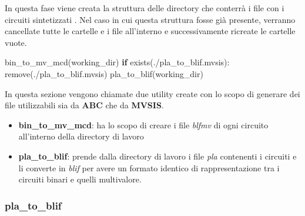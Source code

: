 \documentclass[
]{book}
\newenvironment{Shaded}{\begin{snugshade}}{\end{snugshade}}
\newcommand{\ControlFlowTok}[1]{\textcolor[rgb]{0.13,0.29,0.53}{\textbf{#1}}}
\newcommand{\NormalTok}[1]{#1}
\newcommand{\StringTok}[1]{\textcolor[rgb]{0.31,0.60,0.02}{#1}}
\providecommand{\tightlist}{%
  \setlength{\itemsep}{0pt}\setlength{\parskip}{0pt}}
\begin{document}
In questa fase viene creata la struttura delle directory che conterrà i file con i circuiti sintetizzati . Nel caso in cui questa struttura fosse già presente, verranno cancellate tutte le cartelle e i file all'interno e successivamente ricreate le cartelle vuote.

\begin{Shaded}
\begin{Highlighting}[]
\NormalTok{bin\_to\_mv\_mcd(working\_dir)}
\ControlFlowTok{if}\NormalTok{ exists(}\StringTok{\textquotesingle{}./pla\_to\_blif.mvsis\textquotesingle{}}\NormalTok{):}
\NormalTok{  remove(}\StringTok{\textquotesingle{}./pla\_to\_blif.mvsis\textquotesingle{}}\NormalTok{)}
\NormalTok{pla\_to\_blif(working\_dir)}
\end{Highlighting}
\end{Shaded}

\newpage

In questa sezione vengono chiamate due utility create con lo scopo di generare dei file utilizzabili sia da \textbf{ABC} che da \textbf{MVSIS}.

\begin{itemize}
\tightlist
\item
  \textbf{bin\_to\_mv\_mcd}: ha lo scopo di creare i file \emph{blfmv} di ogni circuito all'interno della directory di lavoro
\item
  \textbf{pla\_to\_blif}: prende dalla directory di lavoro i file \emph{pla} contenenti i circuiti e li converte in \emph{blif} per avere un formato identico di rappresentazione tra i circuiti binari e quelli multivalore.
\end{itemize}

\newpage

\hypertarget{pla_to_blif}{%
\subsubsection{pla\_to\_blif}\label{pla_to_blif}}
\end{document}
